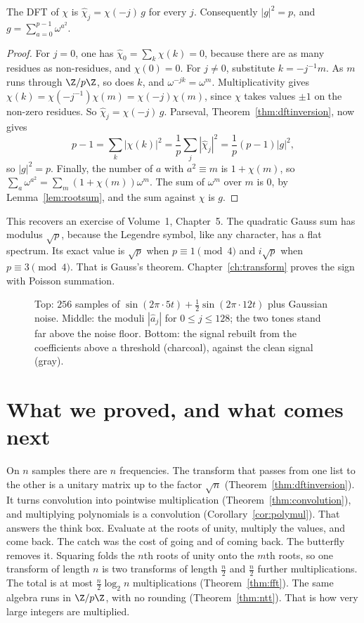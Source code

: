 \begin{proposition}\label{prop:gaussfourier}
The DFT of $\chi$ is $\hat\chi_j=\chi(-j)\,g$ for every $j$. Consequently $|g|^2=p$, and $g=\sum_{a=0}^{p-1}\omega^{a^2}$.
\end{proposition}
\begin{proof}
For $j=0$, one has $\hat\chi_0=\sum_k\chi(k)=0$, because there are as many residues as non-residues, and $\chi(0)=0$. For $j\ne0$, substitute $k=-j^{-1}m$. As $m$ runs through $\Z/p\Z$, so does $k$, and $\omega^{-jk}=\omega^m$. Multiplicativity gives $\chi(k)=\chi(-j^{-1})\chi(m)=\chi(-j)\chi(m)$, since $\chi$ takes values $\pm1$ on the non-zero residues. So $\hat\chi_j=\chi(-j)\,g$. Parseval, Theorem~\ref{thm:dftinversion}, now gives
\[
p-1=\sum_k|\chi(k)|^2=\frac1p\sum_j|\hat\chi_j|^2=\frac1p(p-1)|g|^2,
\]
so $|g|^2=p$. Finally, the number of $a$ with $a^2\equiv m$ is $1+\chi(m)$, so $\sum_a\omega^{a^2}=\sum_m(1+\chi(m))\omega^m$. The sum of $\omega^m$ over $m$ is $0$, by Lemma~\ref{lem:rootsum}, and the sum against $\chi$ is $g$.
\end{proof}

This recovers an exercise of Volume~1, Chapter~5. The quadratic Gauss sum has modulus $\sqrt p$, because the Legendre symbol, like any character, has a flat spectrum. Its exact value is $\sqrt p$ when $p\equiv1\pmod4$ and $i\sqrt p$ when $p\equiv3\pmod4$. That is Gauss's theorem. Chapter~\ref{ch:transform} proves the sign with Poisson summation.

\begin{figure}[ht]
\centering
{}
\caption{Top: $256$ samples of $\sin(2\pi\cdot5t)+\frac12\sin(2\pi\cdot12t)$ plus Gaussian noise. Middle: the moduli $|\hat a_j|$ for
$0\le j\le128$; the two tones stand far above the noise floor. Bottom: the signal rebuilt from the coefficients above a
threshold (charcoal), against the clean signal (gray).}
\label{fig:denoise}
\end{figure}

\section{What we proved, and what comes next}

On $n$ samples there are $n$ frequencies. The transform that passes from one list to the other is a unitary matrix up to the factor $\sqrt n$ (Theorem~\ref{thm:dftinversion}). It turns convolution into pointwise multiplication (Theorem~\ref{thm:convolution}), and multiplying polynomials is a convolution (Corollary~\ref{cor:polymul}). That answers the think box. Evaluate at the roots of unity, multiply the values, and come back. The catch was the cost of going and of coming back. The butterfly removes it. Squaring folds the $n$th roots of unity onto the $m$th roots, so one transform of length $n$ is two transforms of length $\frac n2$ and $\frac n2$ further multiplications. The total is at most $\frac n2\log_2 n$ multiplications (Theorem~\ref{thm:fft}). The same algebra runs in $\Z/p\Z$, with no rounding (Theorem~\ref{thm:ntt}). That is how very large integers are multiplied.

